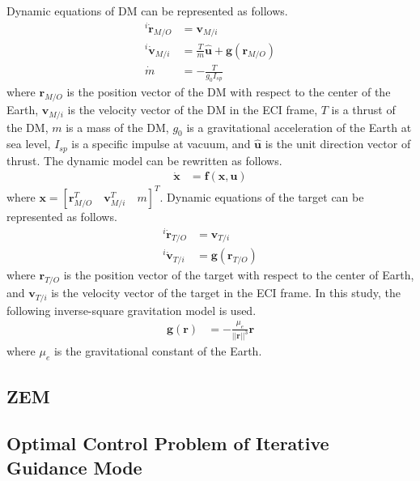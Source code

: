 \documentclass{fdclreport}
\begin{document}
Dynamic equations of DM can be represented as follows.
\begin{align}
	^i\dot{\bm{r}}_{M/O} &= \bm{v}_{M/i} \label{eq:r}\\
	^i\dot{\bm{v}}_{M/i} &= \frac{T}{m} \bm{\hat{u}} + \bm{g}(\bm{r}_{M/O}) \label{eq:v}\\
	\dot{m} &= -\frac{T}{g_0 I_{sp}} \label{eq:m}
\end{align}
where $\bm{r}_{M/O}$ is the position vector of the DM with respect to the center of the Earth, $\bm{v}_{M/i}$ is the velocity vector of the DM in the ECI frame, $T$ is a thrust of the DM, $m$ is a mass of the DM, $g_0$ is a gravitational acceleration of the Earth at sea level, $I_{sp}$ is a specific impulse at vacuum, and $\bm{\hat{u}}$ is the unit direction vector of thrust.
The dynamic model can be rewritten as follows.
\begin{align}
	\dot{\bm{x}} &= \bm{f(x, u)} \label{eq:dyn} 
\end{align}
where $\bm{x} = [\bm{r}_{M/O}^T \quad \bm{v}_{M/i}^T \quad m]^T$.
Dynamic equations of the target can be represented as follows.
\begin{align}
	^i\dot{\bm{r}}_{T/O} &= \bm{v}_{T/i} \label{eq:rT} \\
	^i\dot{\bm{v}}_{T/i} &= \bm{g}(\bm{r}_{T/O}) \label{eq:vT}
\end{align}
where $\bm{r}_{T/O}$ is the position vector of the target with respect to the center of Earth, and $\bm{v}_{T/i}$ is the velocity vector of the target in the ECI frame.
In this study, the following inverse-square gravitation model is used.
\begin{align}
	\bm{g}(\bm{r}) &= -\frac{\mu_e}{||\bm{r}||^3}\bm{r}
\end{align}
where $\mu_e$ is the gravitational constant of the Earth.

\subsection{ZEM}


\subsection{Optimal Control Problem of Iterative Guidance Mode} \label{sec:optimal}
\end{document}
